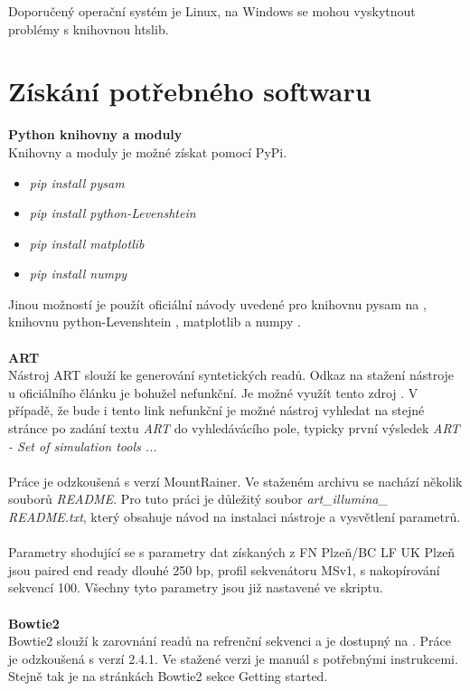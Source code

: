 \documentclass[czech,DP]{thesiskiv}
\numberwithin{equation}{section}
\begin{document}
\noindent
Doporučený operační systém je Linux, na Windows se mohou vyskytnout problémy s knihovnou htslib. 

\section{Získání potřebného softwaru}
\textbf{Python knihovny a moduly} \\
Knihovny a moduly je možné získat pomocí PyPi.
\begin{itemize}
	\item \colorbox{gray!15}{\textit{pip install pysam}}
	\item \colorbox{gray!15}{\textit{pip install python-Levenshtein}}
	\item \colorbox{gray!15}{\textit{pip install matplotlib}}
	\item \colorbox{gray!15}{\textit{pip install numpy}}
\end{itemize}

\noindent
Jinou možností je použít oficiální návody uvedené pro knihovnu pysam na \cite{pysam}, knihovnu python-Levenshtein \cite{python_leve}, matplotlib \cite{matplotlib} a numpy \cite{numpy}.
\\
\\
\textbf{ART}\\
Nástroj ART slouží ke generování syntetických readů. Odkaz na stažení nástroje u oficiálního článku \cite{art} je bohužel nefunkční. Je možné využít tento zdroj \cite{art_download}. V případě, že bude i tento link nefunkční je možné nástroj vyhledat na stejné stránce po zadání textu \textit{ART} do vyhledávácího pole, typicky první výsledek \textit{ART - Set of simulation tools ... }
\\
\\
Práce je odzkoušená s verzí MountRainer. Ve staženém archivu se nachází několik souborů \textit{README}. Pro tuto práci je důležitý soubor \textit{art\_illumina\_\\README.txt}, který obsahuje návod na instalaci nástroje a vysvětlení parametrů.  
\\
\\
Parametry shodující se s parametry dat získaných z FN Plzeň/BC LF UK Plzeň jsou paired end ready dlouhé 250 bp, profil sekvenátoru MSv1, s nakopírování sekvencí 100. Všechny tyto parametry jsou již nastavené ve skriptu.
\\
\\
\textbf{Bowtie2}\\
Bowtie2 slouží k zarovnání readů na refrenční sekvenci a je dostupný na \cite{bowtie2_download}. Práce je odzkoušená s verzí 2.4.1. Ve stažené verzi je manuál s potřebnými instrukcemi. Stejně tak je na stránkách Bowtie2 sekce Getting started. 
\end{document}
